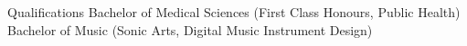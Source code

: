 \begin{rubric}{Qualifications}
      \entry*[2007]
         \prefix{}
         Bachelor of Medical Sciences (First Class Honours, Public Health) 
      \entry*[2016]
         \prefix{}
         Bachelor of Music (Sonic Arts, Digital Music Instrument Design)
\end{rubric}
